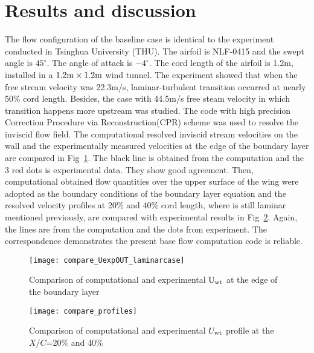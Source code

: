 \documentclass{AIAA}
\begin{document}
\section{Results and discussion}
\label{sec:result}
The flow configuration of the baseline case is identical to the experiment conducted in Tsinghua University (THU). The airfoil is NLF-0415 and the swept angle is $45^\circ$. The angle of attack is $-4^\circ$. The cord length of the airfoil is 1.2m, installed in a $1.2{\rm m}\times1.2{\rm m}$ wind tunnel. The experiment showed that when the free stream velocity was 22.3m/s, laminar-turbulent transition occurred at nearly 50\% cord length. Besides, the case with 44.5m/s free steam velocity in which transition happens more upstream was studied. The code with high precision Correction Procedure via Reconstruction(CPR)\cite{WangZJ2009} scheme was used to resolve the inviscid flow field. The computational resolved inviscid stream velocities on the wall and the experimentally measured velocities at the edge of the boundary layer are compared in Fig~\ref{f:ConpareInvicidV}. The black line is obtained from the computation and the 3 red dots is experimental data. They show good agreement. Then, computational obtained flow quantities over the upper surface of the wing were adopted as the boundary conditions of the boundary layer equation and the resolved velocity profiles at 20\% and 40\% cord length, where is still laminar mentioned previously, are compared with experimental results in Fig~\ref{f:compare_profiles}. Again, the lines are from the computation and the dots from experiment. The correspondence demonstrates the present base flow computation code is reliable.
\begin{figure}
\centering
  \texttt{[image: compare\_UexpOUT\_laminarcase]}
\caption{Comparison of computational and experimental $\rm{U_{wt}}$ at the edge of the boundary layer}
\label{f:ConpareInvicidV}
\end{figure}

\begin{figure}
\centering
  \texttt{[image: compare\_profiles]}
\caption{Comparison of computational and experimental $U_{\rm{wt}}$ profile at the $X/C$=20\% and 40\%}
\label{f:compare_profiles}
\end{figure}
\end{document}
